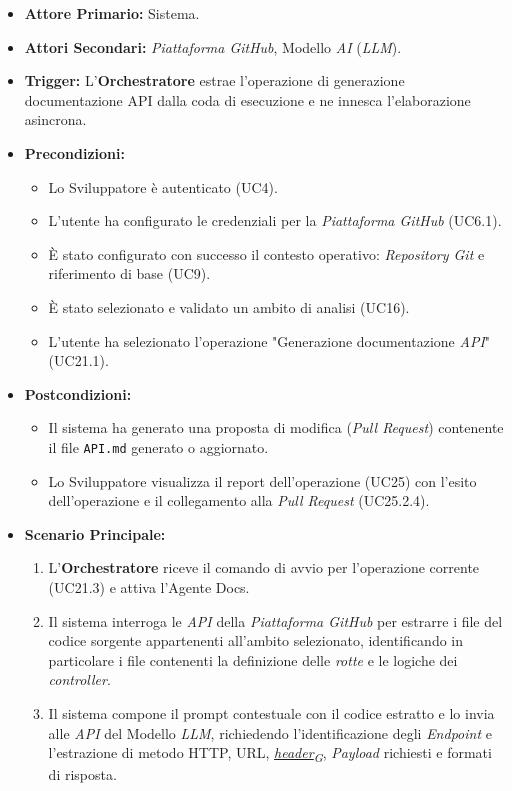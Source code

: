 \documentclass[12pt, a4paper]{article}
\newcommand{\urlglossario}{https://skynetunigroup.github.io/Code_Guardian/Documentazione/PB/glossario_v2.0.0.pdf} %
\newcommand{\glo}[2]{\href{\urlglossario\#nameddest=#2}{#1\textsubscript{G}}}
\begin{document}
\begin{itemize}
    \item \textbf{Attore Primario:} Sistema.
    \item \textbf{Attori Secondari:} \textit{Piattaforma GitHub}, Modello \textit{AI} (\textit{LLM}).
    \item \textbf{Trigger:} L'\textbf{Orchestratore} estrae l'operazione di generazione documentazione API dalla coda di esecuzione e ne innesca l'elaborazione asincrona.
    \item \textbf{Precondizioni:}
    \begin{itemize}
        \item Lo Sviluppatore è autenticato (UC4).
        \item L'utente ha configurato le credenziali per la \textit{Piattaforma GitHub} (UC6.1).
        \item È stato configurato con successo il contesto operativo: \textit{Repository Git} e riferimento di base (UC9).
        \item È stato selezionato e validato un ambito di analisi (UC16).
        \item L'utente ha selezionato l'operazione "Generazione documentazione \textit{API}" (UC21.1).
    \end{itemize}\newpage
    \item \textbf{Postcondizioni:}
    \begin{itemize}
        \item Il sistema ha generato una proposta di modifica (\textit{Pull Request}) contenente il file \texttt{API.md} generato o aggiornato.
        \item Lo Sviluppatore visualizza il report dell'operazione (UC25) con l'esito dell'operazione e il collegamento alla \textit{Pull Request} (UC25.2.4).
    \end{itemize}
    \item \textbf{Scenario Principale:}
    \begin{enumerate}
        \item L'\textbf{Orchestratore} riceve il comando di avvio per l'operazione corrente (UC21.3) e attiva l'Agente Docs.
        \item Il sistema interroga le \textit{API} della \textit{Piattaforma GitHub} per estrarre i file del codice sorgente appartenenti all'ambito selezionato, identificando in particolare i file contenenti la definizione delle \textit{rotte} e le logiche dei \textit{controller}.
        \item Il sistema compone il prompt contestuale con il codice estratto e lo invia alle \textit{API} del Modello \textit{LLM}, richiedendo l'identificazione degli \textit{Endpoint} e l'estrazione di metodo HTTP, URL, \textit{\glo{header}{header}}, \textit{Payload} richiesti e formati di risposta.

\end{enumerate}
\end{itemize}
\end{document}
